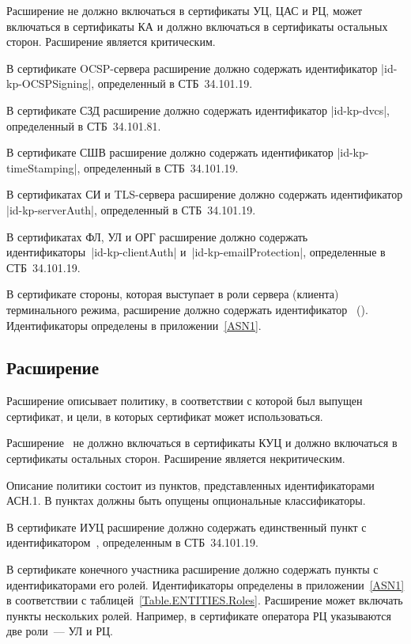 Расширение  не должно включаться в сертификаты УЦ, ЦАС и РЦ,
может включаться в сертификаты КА и должно включаться в сертификаты остальных
сторон. Расширение является критическим.

В сертификате OCSP-сервера расширение должно содержать
идентификатор \code|id-kp-OCSPSigning|, определенный в СТБ~34.101.19.

В сертификате СЗД расширение должно содержать
идентификатор \code|id-kp-dvcs|, определенный в СТБ~34.101.81.

В сертификате СШВ расширение должно содержать
идентификатор \code|id-kp-timeStamping|, определенный в СТБ~34.101.19.

В сертификатах СИ и TLS-сервера расширение должно содержать
идентификатор \code|id-kp-serverAuth|, определенный в СТБ~34.101.19.

В сертификатах ФЛ, УЛ и ОРГ расширение должно содержать 
идентификаторы~\code|id-kp-clientAuth| и~\code|id-kp-emailProtection|,  
определенные в СТБ~34.101.19.

В сертификате стороны, которая выступает в роли сервера (клиента)
терминального режима, расширение  должно содержать
идентификатор~ (). 
Идентификаторы определены в приложении~\ref{ASN1}.

\subsection{Расширение }\label{FMT.Ext.CP}

Расширение  описывает политику, в соответствии 
с которой был выпущен сертификат, и цели, в которых сертификат может 
использоваться. 

Расширение~ не должно включаться в сертификаты
КУЦ и должно включаться в сертификаты остальных сторон. 
Расширение является некритическим.

Описание политики состоит из пунктов, представленных идентификаторами 
АСН.1. В пунктах должны быть опущены опциональные классификаторы. 

В сертификате ИУЦ расширение должно содержать единственный 
пункт с идентификатором~, определенным в СТБ~34.101.19.

В сертификате конечного участника расширение должно содержать пункты с
идентификаторами его ролей. Идентификаторы определены в приложении~\ref{ASN1} в
соответствии с таблицей~\ref{Table.ENTITIES.Roles}. Расширение может включать
пункты нескольких ролей. Например, в сертификате оператора РЦ указываются две
роли~--- УЛ и РЦ.

